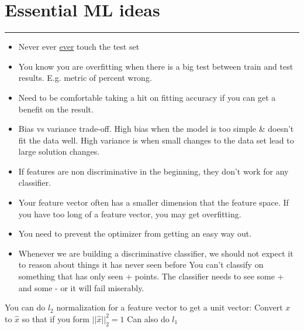 \section{Essential ML ideas}
\smallskip \hrule height 2pt \smallskip

\begin{itemize}
	\item Never ever \underline{ever} touch the test set
	\item You know you are overfitting when there is a big test between train and test results.  E.g. metric of percent wrong. 
	\item Need to be comfortable taking a hit on fitting accuracy if you can get a benefit on the result.
	\item Bias vs variance trade-off.  
		High bias when the model is too simple \& doesn't fit the data well.  
		High variance is when small changes to the data set lead to large solution changes. 
	\item If features are non discriminative in the beginning, they don't work for any classifier.  %
	\item Your feature vector often has a smaller dimension that the feature space.    %
		If you have too long of a feature vector, you may get overfitting. 
	\item You need to prevent the optimizer from getting an easy way out.  %
	\item Whenever we are building a discriminative classifier, 
        		we should not expect it to reason about things it has never seen before
    		You can't classify on something that has only seen + points. 
    		The classifier needs to see some + and some - or it will fail miserably.   %
\end{itemize}

You can do $l_2$ normalization for a feature vector to get a unit vector:   %
	Convert $x$ to $\hat{x}$ so that if you form $||\hat{x}||_2^2 = 1$
	Can also do $l_1$  
